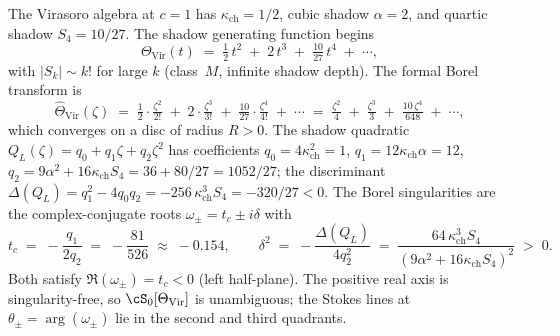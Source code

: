 \begin{example}[Virasoro at \texorpdfstring{$c = 1$}{c = 1}: explicit Borel analysis]
\label{ex:virasoro-borel}
The Virasoro algebra at $c = 1$ has $\kappa_{\mathrm{ch}} = 1/2$, cubic shadow $\alpha = 2$, and quartic shadow $S_4 = 10/27$. The shadow generating function begins
\[
 \Theta_{\mathrm{Vir}}(t) \;=\; \tfrac{1}{2}\, t^2 \;+\; 2\, t^3 \;+\; \tfrac{10}{27}\, t^4 \;+\; \cdots,
\]
with $|S_k| \sim k!$ for large $k$ (class~$M$, infinite shadow depth). The formal Borel transform is
\[
 \hat{\Theta}_{\mathrm{Vir}}(\zeta) \;=\; \tfrac{1}{2} \cdot \tfrac{\zeta^2}{2!} \;+\; 2 \cdot \tfrac{\zeta^3}{3!} \;+\; \tfrac{10}{27} \cdot \tfrac{\zeta^4}{4!} \;+\; \cdots \;=\; \tfrac{\zeta^2}{4} \;+\; \tfrac{\zeta^3}{3} \;+\; \tfrac{10\,\zeta^4}{648} \;+\; \cdots,
\]
which converges on a disc of radius $R > 0$. The shadow quadratic $Q_L(\zeta) = q_0 + q_1\zeta + q_2\zeta^2$ has coefficients $q_0 = 4\kappa_{\mathrm{ch}}^2 = 1$, $q_1 = 12\kappa_{\mathrm{ch}}\alpha = 12$, $q_2 = 9\alpha^2 + 16\kappa_{\mathrm{ch}} S_4 = 36 + 80/27 = 1052/27$; the discriminant $\Delta(Q_L) = q_1^2 - 4 q_0 q_2 = -256\,\kappa_{\mathrm{ch}}^3 S_4 = -320/27 < 0$. The Borel singularities are the complex-conjugate roots $\omega_\pm = t_c \pm i\delta$ with
\[
 t_c \;=\; -\frac{q_1}{2q_2} \;=\; -\frac{81}{526} \;\approx\; -0.154, \qquad \delta^2 \;=\; -\frac{\Delta(Q_L)}{4q_2^2} \;=\; \frac{64\,\kappa_{\mathrm{ch}}^3 S_4}{(9\alpha^2 + 16\kappa_{\mathrm{ch}} S_4)^2} \;>\; 0.
\]
Both satisfy $\Re(\omega_\pm) = t_c < 0$ (left half-plane). The positive real axis is singularity-free, so $\cS_0[\Theta_{\mathrm{Vir}}]$ is unambiguous; the Stokes lines at $\theta_\pm = \arg(\omega_\pm)$ lie in the second and third quadrants.
\end{example}


